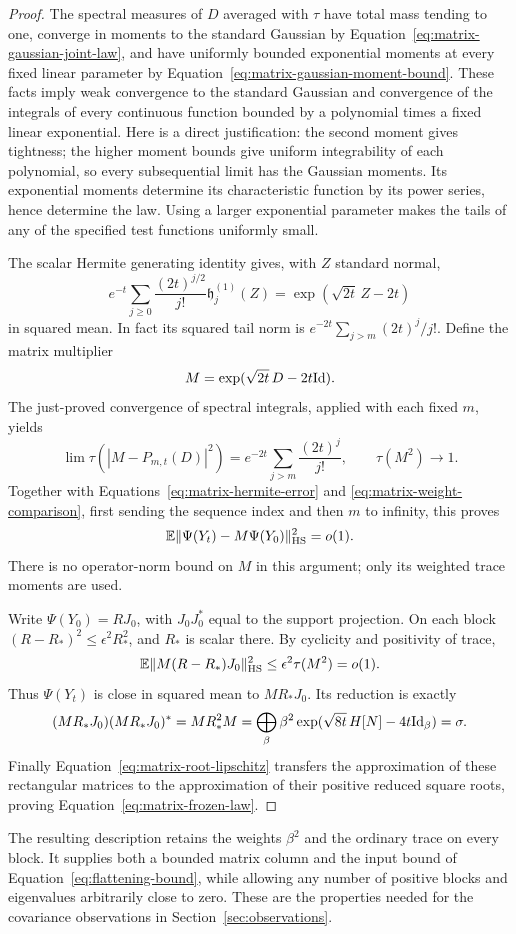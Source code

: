 \begin{proof}
The spectral measures of $D$ averaged with $\tau$ have total mass tending
to one, converge in moments to the standard Gaussian by
Equation~\eqref{eq:matrix-gaussian-joint-law}, and have uniformly bounded
exponential moments at every fixed linear parameter by
Equation~\eqref{eq:matrix-gaussian-moment-bound}.  These facts imply weak
convergence to the standard Gaussian and convergence of the integrals of
every continuous function bounded by a polynomial times a fixed linear
exponential.  Here is a direct justification: the second moment gives
tightness; the higher moment bounds give uniform integrability of each
polynomial, so every subsequential limit has the Gaussian moments.  Its
exponential moments determine its characteristic function by its power
series, hence determine the law.  Using a larger exponential parameter
makes the tails of any of the specified test functions uniformly small.

The scalar Hermite generating identity gives, with $Z$ standard normal,
\[
 e^{-t}\sum_{j\ge0}\frac{(2t)^{j/2}}{j!}\mathfrak h_j^{(1)}(Z)
 =\exp(\sqrt{2t}\,Z-2t)
\]
in squared mean.  In fact its squared tail norm is
$e^{-2t}\sum_{j>m}(2t)^j/j!$.  Define the matrix multiplier
\[
 M=\exp(\sqrt{2t}\,D-2t\mathrm{Id}).
\]
The just-proved convergence of spectral integrals, applied with each
fixed $m$, yields
\begin{equation}\label{eq:matrix-exponential-limit}
 \lim\tau(|M-P_{m,t}(D)|^2)
 =e^{-2t}\sum_{j>m}\frac{(2t)^j}{j!},\qquad
 \tau(M^2)\longrightarrow1.
\end{equation}
Together with Equations~\eqref{eq:matrix-hermite-error} and
\eqref{eq:matrix-weight-comparison}, first sending the sequence index and
then $m$ to infinity, this proves
\[
 \mathbb E\|\Psi(Y_t)-M\Psi(Y_0)\|_{\mathrm{HS}}^2=o(1).
\]
There is no operator-norm bound on $M$ in this argument; only its weighted
trace moments are used.

Write $\Psi(Y_0)=RJ_0$, with $J_0J_0^*$ equal to the support projection.
On each block $(R-R_*)^2\le\epsilon^2R_*^2$, and $R_*$ is scalar there.
By cyclicity and positivity of trace,
\[
 \mathbb E\|M(R-R_*)J_0\|_{\mathrm{HS}}^2
 \le\epsilon^2\tau(M^2)=o(1).
\]
Thus $\Psi(Y_t)$ is close in squared mean to $MR_*J_0$.
Its reduction is exactly
\[
 (MR_*J_0)(MR_*J_0)^*
 =MR_*^2M=\bigoplus_\beta\beta^2
       \exp(\sqrt{8t}\,H[N]-4t\mathrm{Id}_\beta)=\sigma.
\]
Finally Equation~\eqref{eq:matrix-root-lipschitz} transfers the approximation
of these rectangular matrices to the approximation of their positive
reduced square roots, proving Equation~\eqref{eq:matrix-frozen-law}.
\end{proof}

The resulting description retains the weights $\beta^2$ and the ordinary
trace on every block.  It supplies both a bounded matrix column and the
input bound of Equation~\eqref{eq:flattening-bound}, while allowing any
number of positive blocks and eigenvalues arbitrarily close to zero.
These are the properties needed for the covariance observations in
Section~\ref{sec:observations}.
